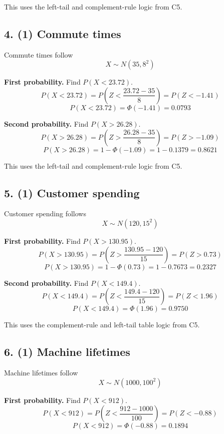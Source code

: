 	This uses the left-tail and complement-rule logic from C5.
	
	
	\subsection*{4. (1) Commute times}
	\label{subsec:contextual-normal-distribution-problems-c6-4}
	Commute times follow
	\[
	X\sim N(35,8^2)
	\]
	
	\textbf{First probability.} Find \(P(X<23.72)\).
	\[
	P(X<23.72)=P\left(Z<\frac{23.72-35}{8}\right)
	=P(Z<-1.41)
	\]
	\[
	P(X<23.72)=\Phi(-1.41)=0.0793
	\]
	
	\textbf{Second probability.} Find \(P(X>26.28)\).
	\[
	P(X>26.28)=P\left(Z>\frac{26.28-35}{8}\right)
	=P(Z>-1.09)
	\]
	\[
	P(X>26.28)=1-\Phi(-1.09)=1-0.1379=0.8621
	\]
	
	This uses the left-tail and complement-rule logic from C5.
	
	
	\subsection*{5. (1) Customer spending}
	\label{subsec:contextual-normal-distribution-problems-c6-5}
	Customer spending follows
	\[
	X\sim N(120,15^2)
	\]
	
	\textbf{First probability.} Find \(P(X>130.95)\).
	\[
	P(X>130.95)=P\left(Z>\frac{130.95-120}{15}\right)
	=P(Z>0.73)
	\]
	\[
	P(X>130.95)=1-\Phi(0.73)=1-0.7673=0.2327
	\]
	
	\textbf{Second probability.} Find \(P(X<149.4)\).
	\[
	P(X<149.4)=P\left(Z<\frac{149.4-120}{15}\right)
	=P(Z<1.96)
	\]
	\[
	P(X<149.4)=\Phi(1.96)=0.9750
	\]
	
	This uses the complement-rule and left-tail table logic from C5.
	
	
	\subsection*{6. (1) Machine lifetimes}
	\label{subsec:contextual-normal-distribution-problems-c6-6}
	Machine lifetimes follow
	\[
	X\sim N(1000,100^2)
	\]
	
	\textbf{First probability.} Find \(P(X<912)\).
	\[
	P(X<912)=P\left(Z<\frac{912-1000}{100}\right)
	=P(Z<-0.88)
	\]
	\[
	P(X<912)=\Phi(-0.88)=0.1894
	\]
	
